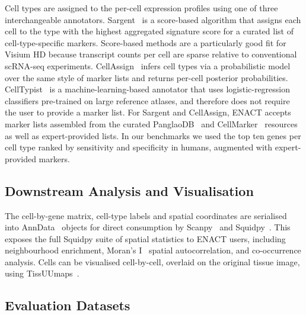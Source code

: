 \documentclass[11pt]{article}
\begin{document}
Cell types are assigned to the per-cell expression profiles using one of three interchangeable annotators. Sargent~\cite{nouri2024sargent} is a score-based algorithm that assigns each cell to the type with the highest aggregated signature score for a curated list of cell-type-specific markers. Score-based methods are a particularly good fit for Visium HD because transcript counts per cell are sparse relative to conventional scRNA-seq experiments. CellAssign~\cite{zhang2019probabilistic} infers cell types via a probabilistic model over the same style of marker lists and returns per-cell posterior probabilities. CellTypist~\cite{conde2022celltypist} is a machine-learning-based annotator that uses logistic-regression classifiers pre-trained on large reference atlases, and therefore does not require the user to provide a marker list. For Sargent and CellAssign, ENACT accepts marker lists assembled from the curated PanglaoDB~\cite{franzen2019panglaodb} and CellMarker~\cite{zhang2019cellmarker} resources as well as expert-provided lists. In our benchmarks we used the top ten genes per cell type ranked by sensitivity and specificity in humans, augmented with expert-provided markers.

\subsection{Downstream Analysis and Visualisation}

The cell-by-gene matrix, cell-type labels and spatial coordinates are serialised into AnnData~\cite{virshup2024anndata} objects for direct consumption by Scanpy~\cite{wolf2018scanpy} and Squidpy~\cite{palla2022squidpy}. This exposes the full Squidpy suite of spatial statistics to ENACT users, including neighbourhood enrichment, Moran's I~\cite{moran1950notes} spatial autocorrelation, and co-occurrence analysis. Cells can be visualised cell-by-cell, overlaid on the original tissue image, using TissUUmaps~\cite{pielawski2023tissuumaps}.

\subsection{Evaluation Datasets}
\end{document}
